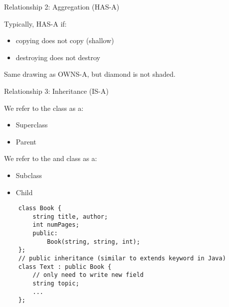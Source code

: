 Relationship 2: Aggregation (HAS-A)

Typically,  HAS-A  if:
\begin{itemize}
    \item copying  does not copy  (shallow)
    \item destroying  does not destroy 
\end{itemize}

Same drawing as OWNS-A, but diamond is not shaded.

Relationship 3: Inheritance (IS-A)

\begin{figure}[H]
    \centering
\end{figure}

We refer to the  class as a:
\begin{itemize}
    \item Superclass
    \item Parent
\end{itemize}

We refer to the  and  class as a:
\begin{itemize}
    \item Subclass
    \item Child
\end{itemize}

\begin{lstlisting}
    class Book {
        string title, author;
        int numPages;
        public:
            Book(string, string, int);
    };
    // public inheritance (similar to extends keyword in Java)
    class Text : public Book {
        // only need to write new field
        string topic;
        ...
    };
\end{lstlisting}


